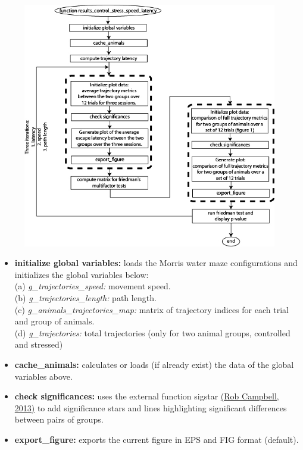 \documentclass[12pt,titlepage]{article}
\begin{document}
\begin{doublespace}
\begin{figure}[H]
	\begin{center}
		\includegraphics[width=0.99\textwidth]{results_control_stress_speed_latency.jpg}
		\label{fig1}
	\end{center}
\end{figure}

\begin{itemize}
	\item\textbf{initialize global variables:} loads the Morris water maze configurations and initializes the global variables below:\\
	 (a) \textit{g\_trajectories\_speed:} movement speed.\\
	 (b) \textit{g\_trajectories\_length:} path length.\\
	 (c) \textit{g\_animals\_trajectories\_map:} matrix of trajectory indices for each trial and group of animals.\\
	 (d) \textit{g\_trajectories:} total trajectories (only for two animal groups, controlled and stressed)
	\item\textbf{cache\_animals:} calculates or loads (if already exist) the data of the global variables above.
	\item\textbf{check significances:} uses the external function sigstar \href{http://www.mathworks.com/matlabcentral/fileexchange/39696-sigstar-groups-stats-nosort-}{(Rob Campbell, 2013)} to add significance stars and lines highlighting significant differences between pairs of groups.
	\item\textbf{export\_figure:} exports the current figure in EPS and FIG format (default).
\end{itemize}


\end{doublespace}
\end{document}

